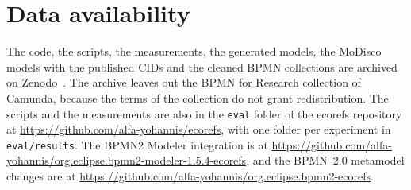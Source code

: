 \documentclass[5p,times,twocolumn]{elsarticle}
\theoremstyle{definition}
\theoremstyle{plain}
\begin{document}
\section*{Data availability}

The code, the scripts, the measurements, the generated models, the MoDisco models with the published CIDs and the cleaned BPMN collections are archived on Zenodo~\cite{yohannis2026data}. The archive leaves out the BPMN for Research collection of Camunda, because the terms of the collection do not grant redistribution. The scripts and the measurements are also in the \texttt{eval} folder of the ecorefs repository at \url{https://github.com/alfa-yohannis/ecorefs}, with one folder per experiment in \texttt{eval/results}. The BPMN2 Modeler integration is at \url{https://github.com/alfa-yohannis/org.eclipse.bpmn2-modeler-1.5.4-ecorefs}, and the BPMN~2.0 metamodel changes are at \url{https://github.com/alfa-yohannis/org.eclipse.bpmn2-ecorefs}.



\end{document}
